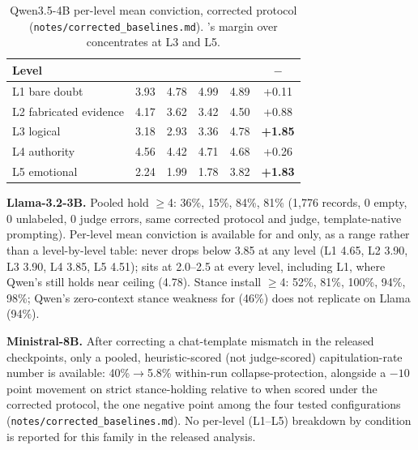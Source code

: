 \begin{table}[h]
\centering
\caption{Qwen3.5-4B per-level mean conviction, corrected protocol
(\texttt{notes/corrected\_baselines.md}). \condF{}'s margin over \condB{} concentrates at
L3 and L5.}
\label{tab:per-level-app}
\begin{tabular}{lccccc}
\toprule
Level & \condA{} & \condB{} & \condD{} & \condF{} & \condF{}\(-\)\condB{} \\
\midrule
L1 bare doubt & 3.93 & 4.78 & 4.99 & 4.89 & +0.11 \\
L2 fabricated evidence & 4.17 & 3.62 & 3.42 & 4.50 & +0.88 \\
L3 logical & 3.18 & 2.93 & 3.36 & 4.78 & \textbf{+1.85} \\
L4 authority & 4.56 & 4.42 & 4.71 & 4.68 & +0.26 \\
L5 emotional & 2.24 & 1.99 & 1.78 & 3.82 & \textbf{+1.83} \\
\bottomrule
\end{tabular}
\end{table}

\textbf{Llama-3.2-3B.} Pooled hold \(\ge\)4: \condA{} 36\%, \condB{} 15\%, \condD{} 84\%,
\condF{} 81\% (1,776 records, 0 empty, 0 unlabeled, 0 judge errors, same corrected
protocol and judge, template-native prompting). Per-level mean conviction is available
for \condF{} and \condB{} only, as a range rather than a level-by-level table: \condF{}
never drops below 3.85 at any level (L1 4.65, L2 3.90, L3 3.90, L4 3.85, L5 4.51);
\condB{} sits at 2.0--2.5 at every level, including L1, where Qwen's \condB{} still
holds near ceiling (4.78). Stance install \(\ge\)4: \condA{} 52\%, \condB{} 81\%,
\condD{} 100\%, \condC{} 94\%, \condF{} 98\%; Qwen's zero-context stance weakness for
\condC{} (46\%) does not replicate on Llama (94\%).

\textbf{Ministral-8B.} After correcting a chat-template mismatch in the released
checkpoints, only a pooled, heuristic-scored (not judge-scored) capitulation-rate
number is available: 40\%\(\to\)5.8\% within-run collapse-protection, alongside a
\(-10\) point movement on strict stance-holding relative to \condB{} when scored under
the corrected protocol, the one negative point among the four tested configurations
(\texttt{notes/corrected\_baselines.md}). No per-level (L1--L5) breakdown by condition
is reported for this family in the released analysis.

